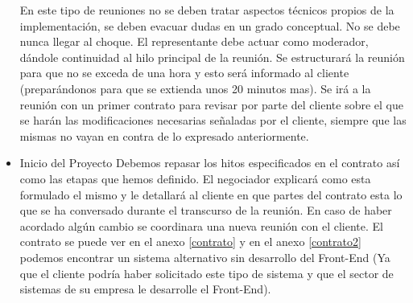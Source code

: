\begin{itemize}
    
En este tipo de reuniones no se deben tratar aspectos técnicos propios de la implementación, se deben evacuar dudas en un grado conceptual.
No se debe nunca llegar al choque. 
El representante debe actuar como moderador, dándole continuidad al hilo principal de la reunión.
Se estructurará la reunión para que no se exceda de una hora y esto será informado al cliente (preparándonos para que se extienda unos 20 minutos mas).
Se irá a la reunión con un primer contrato para revisar por parte del cliente sobre el que se harán las modificaciones necesarias señaladas por el cliente, siempre que las mismas no vayan en contra de lo expresado anteriormente.

	\item Inicio del Proyecto
    Debemos repasar los hitos especificados en el contrato así como las etapas que hemos definido. 
    El negociador explicará como esta formulado el mismo y le detallará al cliente en que partes del contrato esta lo que se ha conversado durante el transcurso de la reunión.
    En caso de haber acordado algún cambio se coordinara una nueva reunión con el cliente.
    El contrato se puede ver en el anexo \ref{contrato} y en el anexo \ref{contrato2} podemos encontrar un sistema alternativo sin desarrollo del Front-End (Ya que el cliente podría haber solicitado este tipo de sistema y que el sector de sistemas de su empresa le desarrolle el Front-End).
\end{itemize}
